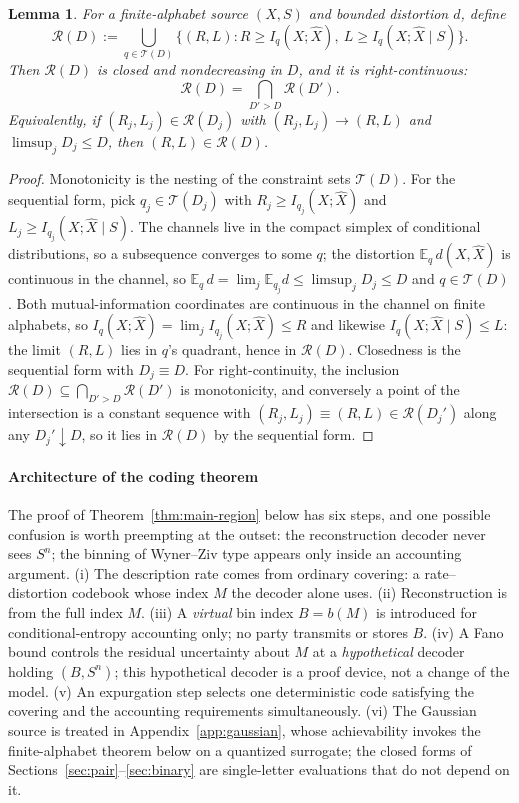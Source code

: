 \documentclass[11pt,onecolumn]{IEEEtran}
\newtheorem{lemma}[theorem]{Lemma}
\newcommand{\E}{\mathbb{E}}
\newcommand{\hX}{\widehat{X}}
\begin{document}
\begin{lemma}
\label{lem:rightcont}
For a finite-alphabet source $(X,S)$ and bounded distortion $d$, define
\[
\mathcal R(D):=\bigcup_{q\in\mathcal T(D)}
\bigl\{(R,L):R\ge I_q(X;\hX),\ L\ge I_q(X;\hX\mid S)\bigr\}.
\]
Then $\mathcal R(D)$ is closed and nondecreasing in $D$, and it is
right-continuous:
\[
\mathcal R(D)=\bigcap_{D'>D}\mathcal R(D').
\]
Equivalently, if $(R_j,L_j)\in\mathcal R(D_j)$ with
$(R_j,L_j)\to(R,L)$ and $\limsup_jD_j\le D$, then
$(R,L)\in\mathcal R(D)$.
\end{lemma}

\begin{proof}
Monotonicity is the nesting of the constraint sets $\mathcal T(D)$. For
the sequential form, pick $q_j\in\mathcal T(D_j)$ with
$R_j\ge I_{q_j}(X;\hX)$ and $L_j\ge I_{q_j}(X;\hX\mid S)$. The channels
live in the compact simplex of conditional distributions, so a
subsequence converges to some $q$; the distortion $\E_q\,d(X,\hX)$ is
continuous in the channel, so
$\E_q\,d=\lim_j\E_{q_j}d\le\limsup_jD_j\le D$ and $q\in\mathcal T(D)$.
Both mutual-information coordinates are continuous in the channel on
finite alphabets, so $I_q(X;\hX)=\lim_jI_{q_j}(X;\hX)\le R$ and
likewise $I_q(X;\hX\mid S)\le L$: the limit $(R,L)$ lies in $q$'s
quadrant, hence in $\mathcal R(D)$. Closedness is the sequential form
with $D_j\equiv D$. For right-continuity, the inclusion
$\mathcal R(D)\subseteq\bigcap_{D'>D}\mathcal R(D')$ is monotonicity,
and conversely a point of the intersection is a constant sequence with
$(R_j,L_j)\equiv(R,L)\in\mathcal R(D_j')$ along any $D_j'\downarrow D$,
so it lies in $\mathcal R(D)$ by the sequential form.
\end{proof}

\paragraph*{Architecture of the coding theorem}
The proof of Theorem~\ref{thm:main-region} below has six steps, and one
possible confusion is worth preempting at the outset: the reconstruction
decoder never sees $S^n$; the binning of Wyner--Ziv type appears only
inside an accounting argument. (i) The description rate comes from
ordinary covering: a rate--distortion codebook whose index $M$ the
decoder alone uses. (ii) Reconstruction is from the full index $M$.
(iii) A \emph{virtual} bin index $B=b(M)$ is introduced for
conditional-entropy accounting only; no party transmits or stores $B$.
(iv) A Fano bound controls the residual uncertainty about $M$ at a
\emph{hypothetical} decoder holding $(B,S^n)$; this hypothetical decoder
is a proof device, not a change of the model. (v) An expurgation step
selects one deterministic code satisfying the covering and the
accounting requirements simultaneously. (vi) The Gaussian source is
treated in Appendix~\ref{app:gaussian}, whose achievability invokes the
finite-alphabet theorem below on a quantized surrogate; the closed
forms of Sections~\ref{sec:pair}--\ref{sec:binary} are single-letter
evaluations that do not depend on it.
\end{document}
